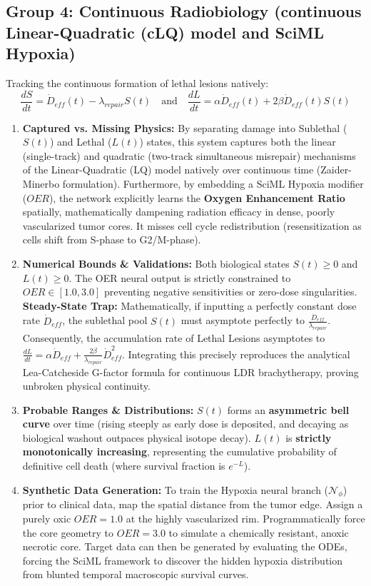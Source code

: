 \documentclass[11pt,a4paper]{article}
\begin{document}
\subsection{Group 4: Continuous Radiobiology (continuous Linear-Quadratic (cLQ) model and SciML Hypoxia)}

Tracking the continuous formation of lethal lesions natively:
\begin{equation}
    \frac{dS}{dt} = \dot{D}_{eff}(t) - \lambda_{repair} S(t) \quad \text{and} \quad \frac{dL}{dt} = \alpha \dot{D}_{eff}(t) + 2\beta \dot{D}_{eff}(t) S(t)
\end{equation}

\begin{enumerate}
    \item \textbf{Captured vs. Missing Physics:} By separating damage into Sublethal ($S(t)$) and Lethal ($L(t)$) states, this system captures both the linear (single-track) and quadratic (two-track simultaneous misrepair) mechanisms of the Linear-Quadratic (LQ) model natively over continuous time (Zaider-Minerbo formulation). Furthermore, by embedding a SciML Hypoxia modifier ($OER$), the network explicitly learns the \textbf{Oxygen Enhancement Ratio} spatially, mathematically dampening radiation efficacy in dense, poorly vascularized tumor cores. It misses cell cycle redistribution (resensitization as cells shift from S-phase to G2/M-phase).
    \item \textbf{Numerical Bounds \& Validations:} Both biological states $S(t) \ge 0$ and $L(t) \ge 0$. The OER neural output is strictly constrained to $OER \in [1.0, 3.0]$ preventing negative sensitivities or zero-dose singularities. \textbf{Steady-State Trap:} Mathematically, if inputting a perfectly constant dose rate $\dot{D}_{eff}$, the sublethal pool $S(t)$ must asymptote perfectly to $\frac{\dot{D}_{eff}}{\lambda_{repair}}$. Consequently, the accumulation rate of Lethal Lesions asymptotes to $\frac{dL}{dt} = \alpha \dot{D}_{eff} + \frac{2\beta}{\lambda_{repair}} \dot{D}_{eff}^2$. Integrating this precisely reproduces the analytical Lea-Catcheside G-factor formula for continuous LDR brachytherapy, proving unbroken physical continuity.
    \item \textbf{Probable Ranges \& Distributions:} $S(t)$ forms an \textbf{asymmetric bell curve} over time (rising steeply as early dose is deposited, and decaying as biological washout outpaces physical isotope decay). $L(t)$ is \textbf{strictly monotonically increasing}, representing the cumulative probability of definitive cell death (where survival fraction is $e^{-L}$).
    \item \textbf{Synthetic Data Generation:} To train the Hypoxia neural branch ($\mathcal{N}_\phi$) prior to clinical data, map the spatial distance from the tumor edge. Assign a purely oxic $OER = 1.0$ at the highly vascularized rim. Programmatically force the core geometry to $OER = 3.0$ to simulate a chemically resistant, anoxic necrotic core. Target data can then be generated by evaluating the ODEs, forcing the SciML framework to discover the hidden hypoxia distribution from blunted temporal macroscopic survival curves.
\end{enumerate}
\end{document}
